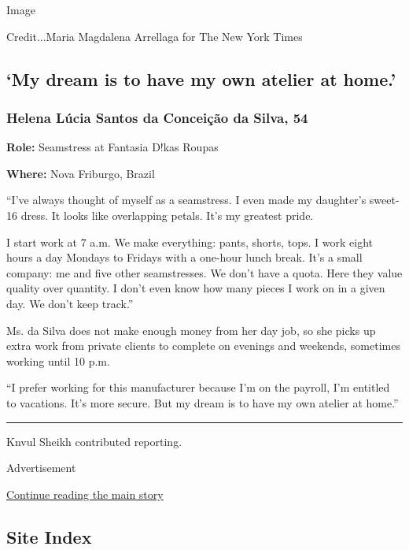 Image

Credit...Maria Magdalena Arrellaga for The New York Times

\hypertarget{my-dream-is-to-have-my-own-atelier-at-home}{%
\subsection{`My dream is to have my own atelier at
home.'}\label{my-dream-is-to-have-my-own-atelier-at-home}}

\hypertarget{helena-luxfacia-santos-da-conceiuxe7uxe3o-da-silva-54}{%
\subsubsection{Helena Lúcia Santos da Conceição da Silva,
54}\label{helena-luxfacia-santos-da-conceiuxe7uxe3o-da-silva-54}}

\textbf{Role:} Seamstress at Fantasia D!kas Roupas

\textbf{Where:} Nova Friburgo, Brazil

``I've always thought of myself as a seamstress. I even made my
daughter's sweet-16 dress. It looks like overlapping petals. It's my
greatest pride.

I start work at 7 a.m. We make everything: pants, shorts, tops. I work
eight hours a day Mondays to Fridays with a one-hour lunch break. It's a
small company: me and five other seamstresses. We don't have a quota.
Here they value quality over quantity. I don't even know how many pieces
I work on in a given day. We don't keep track.''

Ms. da Silva does not make enough money from her day job, so she picks
up extra work from private clients to complete on evenings and weekends,
sometimes working until 10 p.m.

``I prefer working for this manufacturer because I'm on the payroll, I'm
entitled to vacations. It's more secure. But my dream is to have my own
atelier at home.''

\begin{center}\rule{0.5\linewidth}{\linethickness}\end{center}

Knvul Sheikh contributed reporting.

Advertisement

\protect\hyperlink{after-bottom}{Continue reading the main story}

\hypertarget{site-index}{%
\subsection{Site Index}\label{site-index}}

